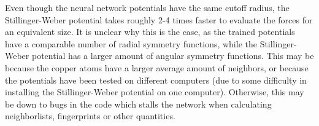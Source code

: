 Even though the neural network potentials have the same cutoff radius,
the Stillinger-Weber potential takes roughly 2-4 times faster to evaluate
the forces for an equivalent size. It is unclear why this is the case,
as the trained potentials have a comparable number of radial symmetry functions,
while the Stillinger-Weber potential has a larger amount of angular symmetry functions.
This may be because the copper atoms have a larger average amount of neighbors,
or because the potentials have been tested on different computers (due to some
    difficulty in installing the Stillinger-Weber potential on one computer).
Otherwise, this may be down to bugs in the code which stalls the network
when calculating neighborlists, fingerprints or other quantities.
